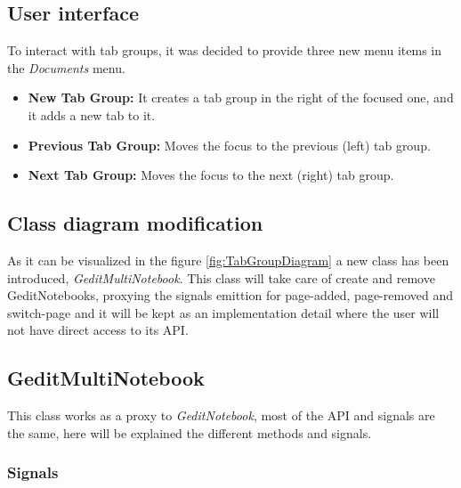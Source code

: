 \subsection{User interface}

To interact with tab groups, it was decided to provide three new menu items in the \emph{Documents} menu.
\begin{itemize}
  \item \textbf{New Tab Group:} It creates a tab group in the right of the focused one, and it adds a new tab to it.
  \item \textbf{Previous Tab Group:} Moves the focus to the previous (left) tab group.
  \item \textbf{Next Tab Group:} Moves the focus to the next (right) tab group.
\end{itemize}

\newpage
\subsection{Class diagram modification}


As it can be visualized in the figure \ref{fig:TabGroupDiagram} a new class has been introduced, \emph{GeditMultiNotebook}. This class will take care of create and remove GeditNotebooks, proxying the signals emittion for page-added, page-removed and switch-page and it will be kept as an implementation detail where the user will not have direct access to its API.

\newpage
\subsection{GeditMultiNotebook}

This class works as a proxy to \emph{GeditNotebook}, most of the API and signals are the same, here will be explained the different methods and signals.

\subsubsection{Signals}

